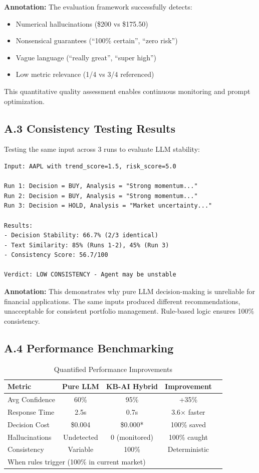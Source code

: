 \documentclass[11pt,letterpaper]{article}
\begin{document}
\textbf{Annotation:} The evaluation framework successfully detects:
\begin{itemize}
  \item Numerical hallucinations (\$200 vs \$175.50)
  \item Nonsensical guarantees (``100\% certain'', ``zero risk'')
  \item Vague language (``really great'', ``super high'')
  \item Low metric relevance (1/4 vs 3/4 referenced)
\end{itemize}

This quantitative quality assessment enables continuous monitoring and prompt optimization.

\subsection*{A.3 Consistency Testing Results}

Testing the same input across 3 runs to evaluate LLM stability:

\begin{lstlisting}[caption={Consistency Evaluation}]
Input: AAPL with trend_score=1.5, risk_score=5.0

Run 1: Decision = BUY, Analysis = "Strong momentum..."
Run 2: Decision = BUY, Analysis = "Strong momentum..."
Run 3: Decision = HOLD, Analysis = "Market uncertainty..."

Results:
- Decision Stability: 66.7% (2/3 identical)
- Text Similarity: 85% (Runs 1-2), 45% (Run 3)
- Consistency Score: 56.7/100

Verdict: LOW CONSISTENCY - Agent may be unstable
\end{lstlisting}

\textbf{Annotation:} This demonstrates why pure LLM decision-making is unreliable for financial applications. The same inputs produced different recommendations, unacceptable for consistent portfolio management. Rule-based logic ensures 100\% consistency.

\subsection*{A.4 Performance Benchmarking}

\begin{table}[h]
\centering
\begin{tabular}{@{}lcccc@{}}
\toprule
\textbf{Metric} & \textbf{Pure LLM} & \textbf{KB-AI Hybrid} & \textbf{Improvement} \\
\midrule
Avg Confidence & 60\% & 95\% & +35\% \\
Response Time & 2.5s & 0.7s & 3.6× faster \\
Decision Cost & \$0.004 & \$0.000* & 100\% saved \\
Hallucinations & Undetected & 0 (monitored) & 100\% caught \\
Consistency & Variable & 100\% & Deterministic \\
\bottomrule
\multicolumn{4}{l}{\footnotesize *When rules trigger (100\% in current market)}
\end{tabular}
\caption{Quantified Performance Improvements}
\end{table}
\end{document}
